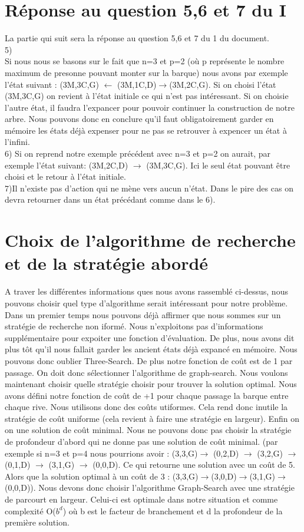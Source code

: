 \documentclass[a4paper, 12pt, french,oneside]{book}
\begin{document}
\section{Réponse au question 5,6 et 7 du I}
La partie qui suit sera la réponse au question 5,6 et 7 du 1 du document. \\
5) \\
Si nous nous se basons sur le fait que n=3 et p=2 (où p représente le nombre maximum de presonne pouvant monter sur la barque) nous avons par exemple l'état suivant :
(3M,3C,G) $\leftarrow$ (3M,1C,D)$\rightarrow$(3M,2C,G). Si on choisi l'état (3M,3C,G) on revient à l'état initiale ce qui n'est pas intéressant. Si on choisie l'autre état, il faudra l'expancer pour pouvoir continuer la construction de notre arbre. Nous pouvons donc en conclure qu'il faut obligatoirement garder en mémoire les états déjà expenser pour ne pas se retrouver à expencer un état à l'infini.\\
6) Si on reprend notre exemple précédent avec n=3 et p=2 on aurait, par exemple l'état suivant: (3M,2C,D) $\rightarrow$ (3M,3C,G). Ici le seul état pouvant être choisi et le retour à l'état initiale.\\
7)Il n'existe pas d'action qui ne mène vers aucun n'état. Dans le pire des cas on devra retourner dans un état précédant comme dans le 6). \\
\section{Choix de l'algorithme de recherche et de la stratégie abordé}
A traver les différentes informations ques nous avons rassemblé ci-dessus, nous pouvons choisir quel type d'algorithme serait intéressant pour notre problème. Dans un premier temps nous pouvons déjà affirmer que nous sommes sur un stratégie de recherche non iformé. Nous n'exploitons pas d'informations supplémentaire pour expoiter une fonction d'évaluation. De plus, nous avons dit plus tôt qu'il nous fallait garder les ancient états déjà expancé en mémoire. Nous pouvons donc oublier Three-Search. De plus notre fonction de coût est de 1 par passage. On doit donc sélectionner l'algorithme de graph-search. Nous voulons maintenant choisir quelle stratégie choisir pour trouver la solution optimal. Nous avons défini notre fonction de coût de +1 pour chaque passage la barque entre chaque rive. Nous utilisons donc des coûts utiformes. Cela rend donc inutile la stratégie de coût uniforme (cela revient à faire une stratégie en largeur). Enfin on on une solution de coût minimal. Nous ne pouvons donc pas choisir la stratégie de profondeur d'abord qui ne donne pas une solution de coût minimal. (par exemple si n=3 et p=4 nous pourrions avoir : (3,3,G)$\rightarrow$ (0,2,D) $\rightarrow$ (3,2,G) $\rightarrow$ (0,1,D) $\rightarrow$ (3,1,G) $\rightarrow$ (0,0,D). Ce qui retourne une solution avec un coût de 5. Alors que la solution optimal à un coût de 3 : (3,3,G)$\rightarrow$(3,0,D)$\rightarrow$(3,1,G)$\rightarrow$(0,0,D)). Nous devons donc choisir l'algorithme Graph-Search avec une stratégie de parcourt en largeur. Celui-ci est optimale dans notre situation et comme complexité O($b^d$) où b est le facteur de branchement et d la profondeur de la première solution.
\end{document}
